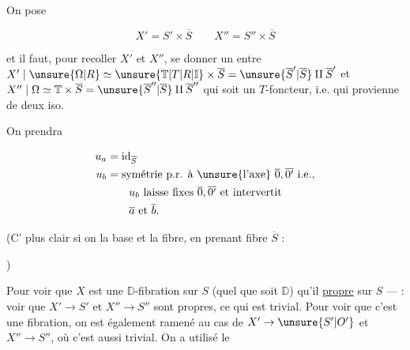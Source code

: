 
On pose

\[
X'=S'\times\overline S\qquad X''=S''\times\overline S
\]


et il faut, pour recoller $X'$ et $X''$, se donner un  entre $X'\mid\unsure{\Omega|R}\simeq\unsure{\mathbb{T}|T|R|\mathbb{I}}\times\overline S=\unsure{\overline S'|\overline S}\amalg\overline S'$ et $X''\mid\Omega\simeq\mathbb{T}\times\overline S=\unsure{\overline S''|\overline S}\amalg\overline S''$ qui  soit un $T$-foncteur, i.e. qui provienne de deux iso.


On prendra 

\[
\begin{aligned}
u_a&=\mathrm{id}_{\overline S}\\
u_b&=\text{symétrie p.r. à \unsure{l'axe} $\overline0,\overline{0'}$ i.e.,}\\
&\qquad u_b\text{ laisse fixes }\overline0,\overline{0'}\text{ et intervertit}\\
&\qquad\overline a\text{ et }\overline b .
\end{aligned}
\]

(C' plus clair si on  la base et la fibre, en prenant fibre $\overline S$ :


)

 Pour voir que $X$ est une  $\mathbb D$-fibration sur $S$ (quel que soit $\mathbb D$)    qu'il  \uline{propre} sur $S$ ---   : voir que $X'\to S'$ et $X''\to S''$ sont propres, ce qui est trivial.  Pour voir que c'est une fibration, on est également ramené au cas de $X'\to \unsure{S'|O'}$ et $X''\to S''$, où c'est aussi trivial. On a utilisé le


